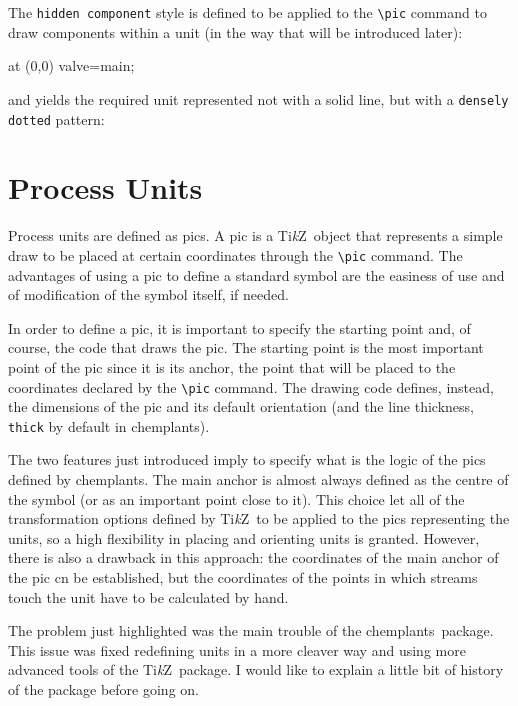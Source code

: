 \documentclass[12pt]{article}						%
\newcommand*{\chps}[1]{\texttt{#1}}				%
\newcommand*{\chemplants}{chemplants}
\newcommand*{\TikZ}{Ti\textit{k}Z}
\begin{document}
The \chps{hidden component} style is defined to be applied to the \verb|\pic|
command to draw components within a unit (in the way that will be introduced
later):
\begin{chpcode}
	 at (0,0) {valve=main};
\end{chpcode}
and yields the required unit represented not with a solid line, but with a
\verb|densely dotted| pattern:
\begin{center}
\end{center}

\section{Process Units}

Process units are defined as pics. A pic is a \TikZ\ object that represents a
simple draw to be placed at certain coordinates through the \verb|\pic| command.
The advantages of using a pic to define a standard symbol are the easiness of
use and of modification of the symbol itself, if needed.

In order to define a pic, it is important to specify the starting point and, of
course, the code that draws the pic. The starting point is the most important
point of the pic since it is its anchor, the point that will be placed to the
coordinates declared by the \verb|\pic| command. The drawing code defines,
instead, the dimensions of the pic and its default orientation (and the line
thickness, \verb|thick| by default in \chemplants).

The two features just introduced imply to specify what is the logic of the
pics defined by \chemplants. The main anchor is almost always defined as the
centre of the symbol (or as an important point close to it). This choice let all
of the transformation options defined by \TikZ\ to be applied to the pics
representing the units, so a high flexibility in placing and orienting units is
granted. However, there is also a drawback in this approach: the coordinates of
the main anchor of the pic cn be established, but the coordinates of the points
in which streams touch the unit have to be calculated by hand.

The problem just highlighted was the main trouble of the \chemplants\ package.
This issue was fixed redefining units in a more cleaver way and using more
advanced tools of the \TikZ\ package. I would like to explain a little bit of
history of the package before going on.
\end{document}
